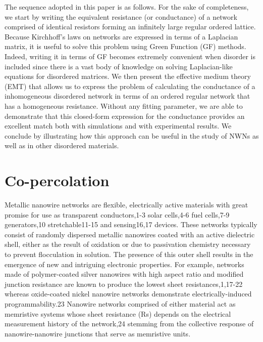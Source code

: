 The sequence adopted in this paper is as follows. For the sake of completeness, we start by writing the equivalent resistance (or conductance) of a network comprised of identical resistors forming an infinitely large regular ordered lattice. Because Kirchhoff's laws on networks are expressed in terms of a Laplacian matrix, it is useful to solve this problem using Green Function (GF) methods. Indeed, writing it in terms of GF becomes extremely convenient when disorder is included since there is a vast body of knowledge on solving Laplacian-like equations\cite{cserti2000} for disordered matrices\cite{economou1984, pingsheng}. We then present the effective medium theory (EMT) that allows us to express the problem of calculating the conductance of a inhomogeneous disordered network in terms of an ordered regular network that has a homogeneous resistance\cite{kirkpatrick1973}. Without any fitting parameter, we are able to demonstrate that this closed-form expression for the conductance provides an excellent match both with simulations and with experimental results. We conclude by illustrating how this approach can be useful in the study of NWNs as well as in other disordered materials. 
\section{Co-percolation}
Metallic nanowire networks are flexible, electrically active materials with great promise for use as transparent conductors,1-3 solar cells,4-6 fuel cells,7-9 generators,10 stretchable11-15 and sensing16,17 devices. These networks typically consist of randomly dispersed metallic nanowires coated with an active dielectric shell, either as the result of oxidation or due to passivation chemistry necessary to prevent flocculation in solution. The presence of this outer shell results in the emergence of new and intriguing electronic properties. For example, networks made of polymer-coated silver nanowires with high aspect ratio and modified junction resistance are known to produce the lowest sheet resistances,1,17-22 whereas oxide-coated nickel nanowire networks demonstrate electrically-induced programmability.23 Nanowire networks comprised of either material act as memristive systems whose sheet resistance (Rs) depends on the electrical measurement history of the network,24 stemming from the collective response of nanowire-nanowire junctions that serve as memristive units.

